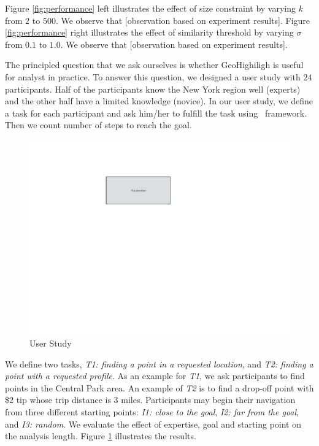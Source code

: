 Figure \ref{fig:performance} left illustrates the effect of size constraint by varying $k$ from $2$ to $500$. We observe that [observation based on experiment results]. Figure \ref{fig:performance} right illustrates the effect of similarity threshold by varying $\sigma$ from $0.1$ to $1.0$. We observe that [observation based on experiment results].

\vspace{5pt}
The principled question that we ask ourselves is whether {\sc GeoHighiligh} is useful for analyst in practice. To answer this question, we designed a user study with $24$ participants. Half of the participants know the New York region well (experts) and the other half have a limited knowledge (novice). In our user study, we define a task for each participant and ask him/her to fulfill the task using \framework\ framework. Then we count number of steps to reach the goal.

\begin{figure}
  \centering
  \includegraphics[width=\columnwidth]{figs/placeholder}
\caption{User Study}
\label{fig:userstudy}
\end{figure}

We define two tasks, {\em T1: finding a point in a requested location}, and {\em T2: finding a point with a requested profile}. As an example for {\em T1}, we ask participants to find points in the Central Park area. An example of {\em T2} is to find a drop-off point with \$2 tip whose trip distance is 3 miles. Participants may begin their navigation from three different starting points: {\em I1: close to the goal}, {\em I2: far from the goal}, and {\em I3: random}. We evaluate the effect of expertise, goal and starting point on the analysis length. Figure \ref{fig:userstudy} illustrates the results.

